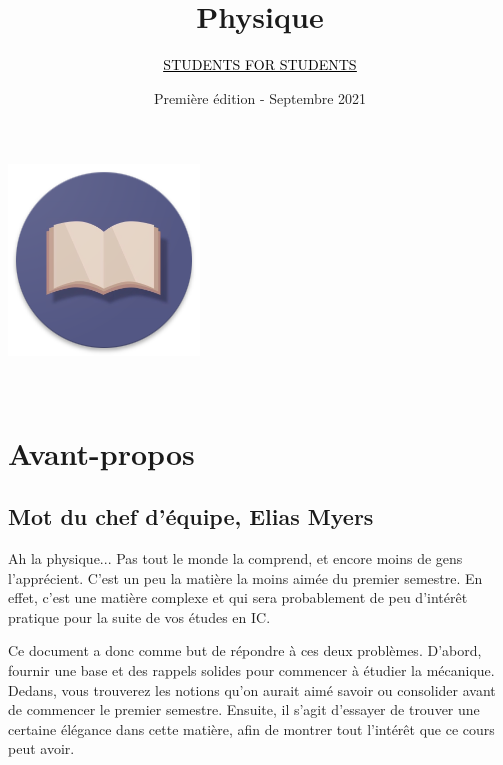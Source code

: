 \documentclass{article}
\title{Physique}
\author{\href{https://students-4-students.github.io}{\textcolor{black}{\underline{STUDENTS FOR STUDENTS}}}}
\date{Première édition - Septembre 2021}
\begin{document}
\maketitle
\vspace{6\baselineskip}
\begin{center}
   \includegraphics[scale=1]{Images/ic_launcher.png} 
\end{center}


\newpage $ $
\newpage
\nonumber
\newpage
\section*{Avant-propos}

\subsection*{Mot du chef d'équipe, Elias Myers}

Ah la physique... Pas tout le monde la comprend, et encore moins de gens l'apprécient. C'est un peu la matière la moins aimée du premier semestre. En effet, c'est une matière complexe et qui sera probablement de peu d'intérêt pratique pour la suite de vos études en IC. 

Ce document a donc comme but de répondre à ces deux problèmes. D'abord, fournir une base et des rappels solides pour commencer à étudier la mécanique. Dedans, vous trouverez les notions qu'on aurait aimé savoir ou consolider avant de commencer le premier semestre. Ensuite, il s'agit d'essayer de trouver une certaine élégance dans cette matière, afin de montrer tout l'intérêt que ce cours peut avoir.
\end{document}
